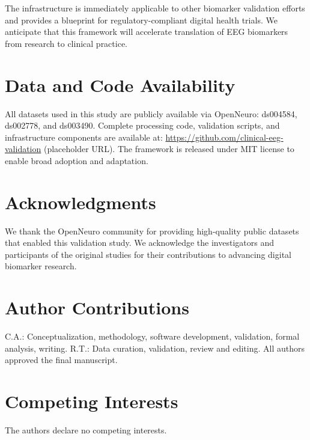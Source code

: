 \documentclass[11pt]{article}
\begin{document}
The infrastructure is immediately applicable to other biomarker validation efforts and provides a blueprint for regulatory-compliant digital health trials. We anticipate that this framework will accelerate translation of EEG biomarkers from research to clinical practice.

\section{Data and Code Availability}

All datasets used in this study are publicly available via OpenNeuro: ds004584, ds002778, and ds003490. Complete processing code, validation scripts, and infrastructure components are available at: \url{https://github.com/clinical-eeg-validation} (placeholder URL). The framework is released under MIT license to enable broad adoption and adaptation.

\section*{Acknowledgments}

We thank the OpenNeuro community for providing high-quality public datasets that enabled this validation study. We acknowledge the investigators and participants of the original studies for their contributions to advancing digital biomarker research.

\section*{Author Contributions}

C.A.: Conceptualization, methodology, software development, validation, formal analysis, writing. R.T.: Data curation, validation, review and editing. All authors approved the final manuscript.

\section*{Competing Interests}

The authors declare no competing interests.



\end{document}

